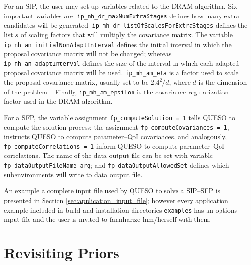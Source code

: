 For an SIP, the user may set up variables related to the DRAM algorithm. Six important variables are:  
\texttt{ip\_mh\_dr\_maxNumExtraStages} defines how many extra candidates will be generated; 
\texttt{ip\_mh\_dr\_listOfScalesForExtraStages} defines the list $s$ of scaling factors that will multiply the covariance matrix.
The variable \texttt{ip\_mh\_am\_initialNonAdaptInterval} defines the initial interval in which the proposal covariance matrix will not be changed;
whereas \texttt{ip\_mh\_am\_adaptInterval} defines the size of the interval in which each adapted proposal covariance matrix will be used. 
\texttt{ip\_mh\_am\_eta} is a factor used to scale the proposal covariance matrix, usually set to be $2.4^2/d$, where $d$ is the dimension of the problem~\cite{Laine08,HaLaMiSa06}. 
Finally, \texttt{ip\_mh\_am\_epsilon} is the covariance regularization factor used in the DRAM algorithm. %

For a SFP, the variable assignment \verb+fp_computeSolution = 1+ tells QUESO to compute the solution process; the assignment \verb+fp_computeCovariances = 1+,  instructs QUESO to compute parameter--QoI covariances, and analogously, \verb+fp_computeCorrelations = 1+ inform QUESO to compute  parameter--QoI correlations. The name of the data output file can be set with variable \verb+fp_dataOutputFileName arg+;  and \verb+fp_dataOutputAllowedSet+ defines which subenvironments will write to data output file.

An example a complete input file used by QUESO to solve a SIP--SFP is presented in Section \ref{sec:application_input_file}; however every application example included in \Queso{} build and installation directories \verb+examples+ has an options input file and the user is invited to familiarize him/herself with them.



\section{Revisiting Priors}

